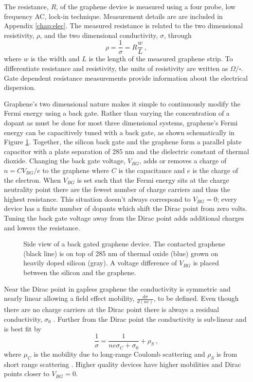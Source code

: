 The resistance, $R$, of the graphene device is measured using a four probe, low frequency AC, lock-in technique. 
Measurement details are are included in Appendix \ref{chap:elec}.
The measured resistance is related to the two dimensional resistivity, $\rho$, and the two dimensional conductivity, $\sigma$, through
\begin{equation*}
	\rho=\frac{1}{\sigma}=R \frac{w}{L} \ ,
\end{equation*}
where $w$ is the width and $L$ is the length of the measured graphene strip.
To differentiate resistance and resistivity, the units of resistivity are written as $\Omega/\square$.
Gate dependent resistance measurements provide information about the electrical dispersion.

Graphene's two dimensional nature makes it simple to continuously modify the Fermi energy using a back gate.
Rather than varying the concentration of a dopant as must be done for most three dimensional systems, graphene's Fermi energy can be capacitively tuned with a back gate, as shown schematically in Figure \ref{fig:kek:FET}.
Together, the silicon back gate and the graphene form a parallel plate capacitor with a plate separation of 285 nm and the dielectric constant of thermal dioxide.
Changing the back gate voltage, $V_{BG}$, adds or removes a charge of $n=CV_{BG}/e$ to the graphene where $C$ is the capacitance and $e$ is the charge of the electron.
When $V_{BG}$ is set such that the Fermi energy sits at the charge neutrality point there are the fewest number of charge carriers and thus the highest resistance.
This situation doesn't always correspond to $V_{BG}=0$; every device has a finite number of dopants which shift the Dirac point from zero volts.
Tuning the back gate voltage away from the Dirac point adds additional charges and lowers the resistance.

\begin{figure}
	\begin{center}
	
	\end{center}
	\caption[Side view of a back gated graphene device.]{\label{fig:kek:FET} 
	Side view of a back gated graphene device.
	The contacted graphene (black line) is on top of 285 nm of thermal oxide (blue) grown on heavily doped silicon (gray).
	A voltage difference of $V_{BG}$ is placed between the silicon and the graphene.
	}	
\end{figure}

Near the Dirac point in gapless graphene the conductivity is symmetric and nearly linear allowing a field effect mobility, $\frac{d \sigma}{d (n e)}$, to be defined.
Even though there are no charge carriers at the Dirac point there is always a residual conductivity, $\sigma_0$ \cite{DasSarma2011}.
Further from the Dirac point the conductivity is sub-linear and is best fit by
\begin{equation*}
	\frac{1}{\sigma}=\frac{1}{n e \sigma_C + \sigma_0} + \rho_S \ ,
\end{equation*}
where $\mu_C$ is the mobility due to long-range Coulomb scattering and $\rho_S$ is from short range scattering \cite{Dean2010,DasSarma2011,Remi2013T}.
Higher quality devices have higher mobilities and Dirac points closer to $V_{BG}=0$.

